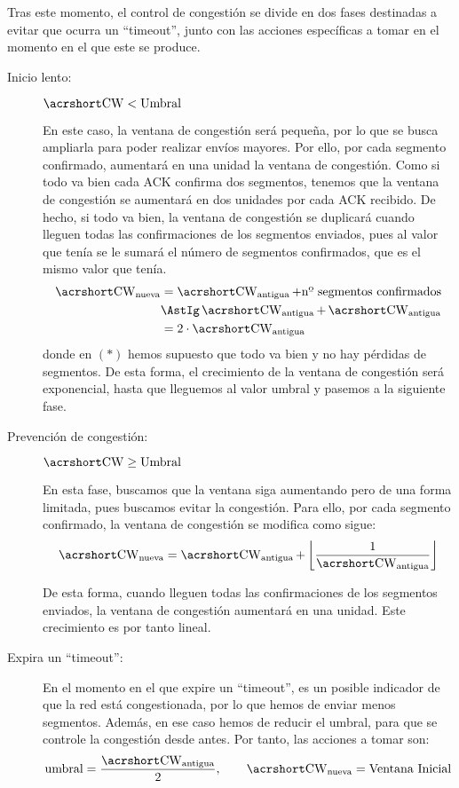 Tras este momento, el control de congestión se divide en dos fases destinadas a evitar que ocurra un ``timeout'', junto con las acciones específicas a tomar en el momento en el que este se produce.
\begin{description}
    \item [Inicio lento:] $\cw < \text{Umbral}$
    
    En este caso, la ventana de congestión será pequeña, por lo que se busca ampliarla para poder realizar envíos mayores. Por ello, por cada segmento confirmado, aumentará en una unidad la ventana de congestión. Como si todo va bien cada \acrshort{ACK} confirma dos segmentos, tenemos que la ventana de congestión se aumentará en dos unidades por cada \acrshort{ACK} recibido. De hecho, si todo va bien, la ventana de congestión se duplicará cuando lleguen todas las confirmaciones de los segmentos enviados, pues al valor que tenía se le sumará el número de segmentos confirmados, que es el mismo valor que tenía.
    \begin{align*}
        \cw_{\text{nueva}} &= \cw_{\text{antigua}} + \text{nº segmentos confirmados} \\
            &\AstIg \cw_{\text{antigua}} + \cw_{\text{antigua}}\\
            &= 2 \cdot \cw_{\text{antigua}}
    \end{align*}
    donde en $(\ast)$ hemos supuesto que todo va bien y no hay pérdidas de segmentos. De esta forma, el crecimiento de la ventana de congestión será exponencial, hasta que lleguemos al valor umbral y pasemos a la siguiente fase.

    \item [Prevención de congestión:] $\cw \geq \text{Umbral}$
    
    En esta fase, buscamos que la ventana siga aumentando pero de una forma limitada, pues buscamos evitar la congestión. Para ello, por cada segmento confirmado, la ventana de congestión se modifica como sigue:
    \begin{equation*}
        \cw_{\text{nueva}} = \cw_{\text{antigua}} + \left\lfloor\frac{1}{\cw_{\text{antigua}}}\right\rfloor
    \end{equation*}

    De esta forma, cuando lleguen todas las confirmaciones de los segmentos enviados, la ventana de congestión aumentará en una unidad. Este crecimiento es por tanto lineal.


    \item [Expira un ``timeout'':] En el momento en el que expire un ``timeout'', es un posible indicador de que la red está congestionada, por lo que hemos de enviar menos segmentos. Además, en ese caso hemos de reducir el umbral, para que se controle la congestión desde antes. Por tanto, las acciones a tomar son:
    \begin{equation*}
        \text{umbral} = \frac{\cw_{\text{antigua}}}{2}, \qquad \cw_{\text{nueva}} = \text{Ventana Inicial}
    \end{equation*}


\end{description}
